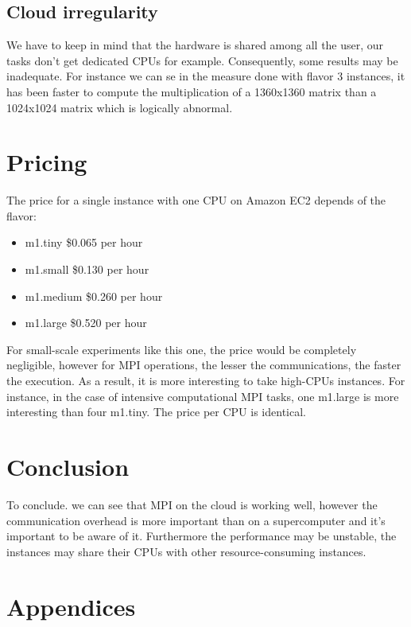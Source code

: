 \documentclass[a4paper,11pt]{article}
\begin{document}
\subsection{Cloud irregularity}

We have to keep in mind that the hardware is shared among all the user, our
tasks don't get dedicated CPUs for example. Consequently, some results may be
inadequate. For instance we can se in the measure done with flavor 3 instances,
it has been faster to compute the multiplication of a 1360x1360 matrix than a
1024x1024 matrix which is logically abnormal.

\section{Pricing}

The price for a single instance with one CPU on Amazon EC2 depends of the flavor:

\begin{itemize}
 \item m1.tiny \$0.065 per hour
 \item m1.small \$0.130 per hour
 \item m1.medium \$0.260 per hour
 \item m1.large \$0.520 per hour
\end{itemize}

For small-scale experiments like this one, the price would be completely
negligible, however for MPI operations, the lesser the communications, the
faster the execution. As a result, it is more interesting to take high-CPUs
instances. For instance, in the case of intensive computational MPI tasks, one 
m1.large is more interesting than four m1.tiny. The price per CPU is identical.

\section*{Conclusion}

To conclude. we can see that MPI on the cloud is working well, however the
communication overhead is more important than on a supercomputer and it's
important to be aware of it. Furthermore the performance may be unstable, the
instances may share their CPUs with other resource-consuming instances.



\section*{Appendices}
\appendix 
\end{document}
